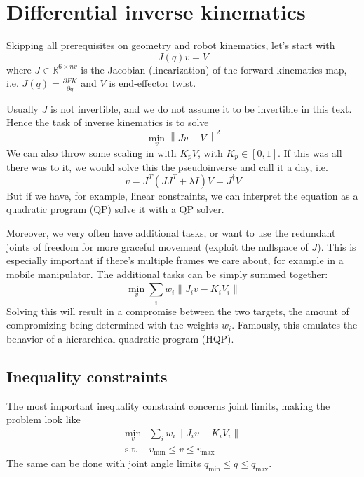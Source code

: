 \documentclass{article}
\begin{document}
\section{Differential inverse kinematics}
Skipping all prerequisites on geometry and robot kinematics,
let's start with
\begin{equation}
J (q) v = V
\end{equation}
where $ J \in \mathbb{R}^{6 \times nv}  $ is the Jacobian (linearization)
of the forward kinematics map, i.e. $ J (q) = \frac{\partial FK}{\partial q}   $
and $ V  $ is end-effector twist.

Usually $ J  $ is not invertible, and we do not assume it to be invertible in this text.
Hence the task of inverse kinematics is to solve
\begin{equation}
\min_{v} \left\lVert J v - V \right \rVert ^{ 2 }
\end{equation}
We can also throw some scaling in with $ K_{ p } V  $, with
$ K_{ p } \in [0,1]  $.
If this was all there was to it, we would solve this the pseudoinverse and call it a day, i.e.
\begin{equation}
v = J^{ T } (J J^{ T } + \lambda I) V = J^{ \dagger }V
\end{equation}
But if we have, for example, linear constraints, we can interpret
the equation as a quadratic program (QP) solve it 
with a QP solver.

Moreover, we very often have additional tasks, or want to use the redundant 
joints of freedom for more graceful movement (exploit the nullspace of $ J  $).
This is especially important if there's multiple frames we care about,
for example in a mobile manipulator.
The additional tasks can be simply summed together:
\begin{equation}
\min_{v} \sum_{i}^{} w_{ i } \left\lVert J_{ i } v - K_{ i } V_{ i } \right \rVert 
\end{equation}
Solving this will result in a compromise between the two targets,
the amount of compromizing being determined with the weights $ w_{ i }  $.
Famously, this emulates the behavior of a hierarchical quadratic program (HQP).

\subsection{Inequality constraints}
The most important inequality constraint concerns joint limits,
making the problem look like
\begin{align}
		\min_{v}& \sum_{i}^{} w_{ i } 
		\left\lVert J_{ i } v - K_{ i } V_{ i } \right \rVert \\
		\text{s.t. } & v_{ \min } \leq v \leq v_{ \max }
\end{align}
The same can be done with joint angle limits 
$ q_{ \min } \leq q \leq q_{ \max }  $.
\end{document}
